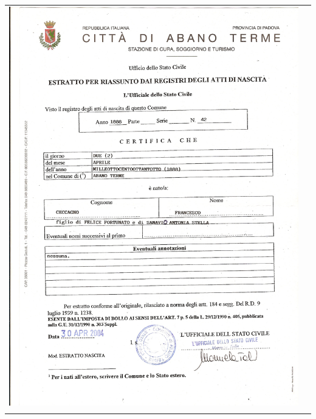 \documentclass[a4paper,10pt]{book}
\begin{document}
\begin{tabular}{ c c }
  \includegraphics[height=0.35\textheight]{../img/08-francesco.png}\label{fig:08-francesco}
  \\ \\

\end{tabular}
\end{document}
